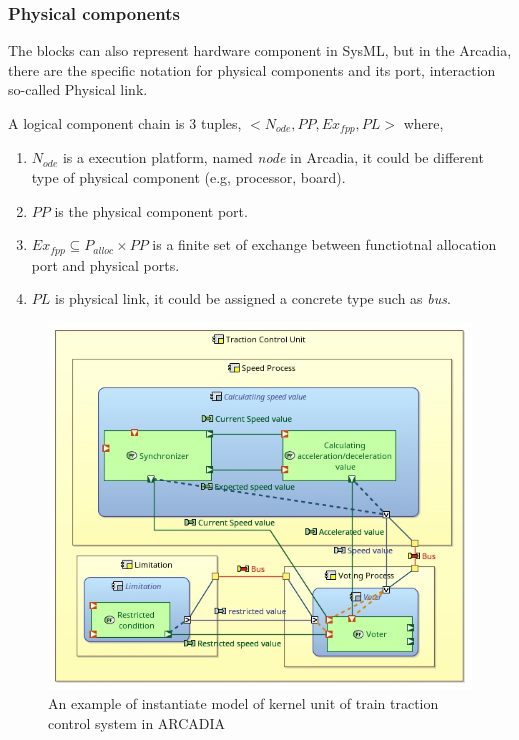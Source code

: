 \subsubsection{Physical components}
The blocks can also represent hardware component in SysML, but in the Arcadia, there are the specific notation for physical components and its port, interaction so-called Physical link. 

\label{def:pc}
    A logical component chain is 3 tuples, $< N_{ode}, PP, Ex_{fpp}, PL>$ where,
\begin{enumerate}
\item $N_{ode}$ is a execution platform, named \textit{node} in Arcadia, it could be different type of physical component (e.g, processor, board). 
\item $PP$ is the physical component port.
\item $Ex_{fpp} \subseteq P_{alloc} \times PP$ is a finite set of exchange between functiotnal allocation port and physical ports. 
\item $PL$ is physical link, it could be assigned a concrete type such as \textit{bus}.  
\end{enumerate}  %


\begin{figure}[hbt]
\centering
\includegraphics[width=\linewidth]{img/VTCSystem}
\caption{An example of instantiate model of kernel unit of train traction control system in ARCADIA}
\label{fig:VTCS}
\end{figure}



